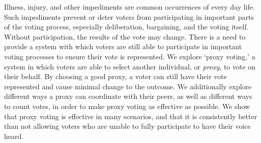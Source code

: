 %
%
%

\begin{publicabstract}

    Illness, injury, and other impediments are common occurrences of every day life.
    Such impediments prevent or deter voters from participating in important parts
    of the voting process, especially deliberation, bargaining, and the voting
    itself.
    Without participation, the results of the vote may change.
    There is a need to provide a system with which voters are still able to
    participate in important voting processes to ensure their vote is represented.
    We explore `proxy voting,' a system in which voters are able to select another
    individual, or \textit{proxy}, to vote on their behalf.
    By choosing a good proxy, a voter can still have their vote represented and cause minimal change to the outcome.
    We additionally explore different ways a proxy can coordinate with their peers,
    as well as different ways to count votes, in order to make proxy voting as
    effective as possible.
    We show that proxy voting is effective in many scenarios, and that it is
    consistently better than not allowing voters who are unable to fully participate to
    have their voice heard.

\end{publicabstract}


